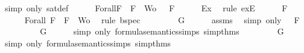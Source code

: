 \begin{isabellebody}
\ {\isacharparenleft}simp\ only{\isacharcolon}\ sat{\isacharunderscore}def{\isacharparenright}\isanewline
\ \ \isamarkupfalse%
\ {\isasymA}\ \ Forall{}{\isacharcolon}{\isachardoublequoteopen}{\isasymforall}F\ {\isasymin}\ {\isacharparenleft}{\isacharbraceleft}F{\isacharbraceright}\ {\isasymunion}\ Wo{\isacharparenright}{\isachardot}\ {\isasymA}\ {\isasymTurnstile}\ F{\isachardoublequoteclose}\isanewline
\ \ \ \ \isamarkupfalse%
\ Ex{}\ \isamarkupfalse%
\ {\isacharparenleft}rule\ exE{\isacharparenright}\isanewline
\ \ \isamarkupfalse%
\ {\isachardoublequoteopen}{\isasymA}\ {\isasymTurnstile}\ F{\isachardoublequoteclose}\isanewline
\ \ \ \ \isamarkupfalse%
\ Forall{}\ {\isacartoucheopen}F\ {\isasymin}\ {\isacharbraceleft}F{\isacharbraceright}\ {\isasymunion}\ Wo{\isacartoucheclose}\ \isamarkupfalse%
\ {\isacharparenleft}rule\ bspec{\isacharparenright}\isanewline
\ \ \isamarkupfalse%
\ \isamarkupfalse%
\ {\isachardoublequoteopen}{\isasymA}\ {\isasymTurnstile}\ \isactrlbold {\isasymnot}{\isacharparenleft}\isactrlbold {\isasymnot}\ G{\isacharparenright}{\isachardoublequoteclose}\isanewline
\ \ \ \ \isamarkupfalse%
\ assms{\isacharparenleft}{}{\isacharparenright}\ \isamarkupfalse%
\ {\isacharparenleft}simp\ only{\isacharcolon}\ {\isacartoucheopen}{\isasymA}\ {\isasymTurnstile}\ F{\isacartoucheclose}{\isacharparenright}\isanewline
\ \ \isamarkupfalse%
\ \isamarkupfalse%
\ {\isachardoublequoteopen}{\isasymnot}\ {\isasymA}\ {\isasymTurnstile}\ \isactrlbold {\isasymnot}\ G{\isachardoublequoteclose}\isanewline
\ \ \ \ \isamarkupfalse%
\ {\isacharparenleft}simp\ only{\isacharcolon}\ formula{\isacharunderscore}semantics{\isachardot}simps{\isacharparenleft}{}{\isacharparenright}\ simp{\isacharunderscore}thms{\isacharparenleft}{}{\isacharparenright}{\isacharparenright}\isanewline
\ \ \isamarkupfalse%
\ \isamarkupfalse%
\ {\isachardoublequoteopen}{\isasymnot}\ {\isasymnot}{\isasymA}\ {\isasymTurnstile}\ G{\isachardoublequoteclose}\isanewline
\ \ \ \ \isamarkupfalse%
\ {\isacharparenleft}simp\ only{\isacharcolon}\ formula{\isacharunderscore}semantics{\isachardot}simps{\isacharparenleft}{}{\isacharparenright}\ simp{\isacharunderscore}thms{\isacharparenleft}{}{\isacharparenright}{\isacharparenright}\isanewline

\end{isabellebody}
